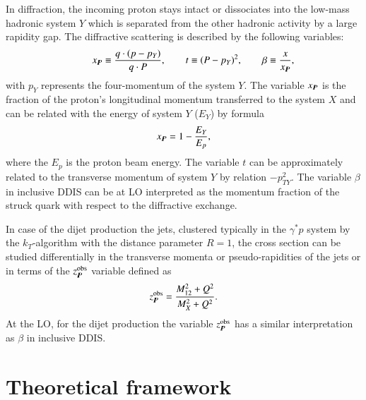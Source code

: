 \documentclass[12pt]{article}
\begin{document}
In diffraction, the incoming proton stays intact or dissociates into the low-mass hadronic system $Y$ which is separated from the other hadronic activity by a large rapidity gap.
The diffractive scattering is described by the following variables:
\begin{equation}
\qquad x_{I\!\!P} \equiv \frac{q \cdot (p - p_Y)}{q\cdot P},\qquad   t \equiv (P - p_Y)^2,       \qquad \beta \equiv \frac{x}{x_{I\!\!P}},
\end{equation}
with $p_Y$ represents the four-momentum of the system $Y$.
The variable $x_{I\!\!P}$ is the fraction of the proton's longitudinal momentum transferred to the system $X$ and can be related with the energy of system $Y$ ($E_Y$) by formula
\begin{equation}
x_{I\!\!P} = 1 - \frac{E_Y}{E_p},
\end{equation}
where the $E_p$ is the proton beam energy.
The variable $t$ can be approximately related to the transverse momentum of system $Y$ by relation $- p_{TY}^2$.
The variable $\beta$ in inclusive DDIS can be at LO interpreted as the  momentum fraction of the struck quark with respect to the diffractive exchange.

In case of the dijet production the jets, clustered typically in the $\gamma^{*}p$ system by the $k_T$-algorithm with the distance parameter $R = 1$, the cross section can be studied differentially in the transverse momenta or pseudo-rapidities of the jets or in terms of the $z_{I\!\!P}^\mathrm{obs}$ variable defined as
\begin{equation}
z_{I\!\!P}^\mathrm{obs} = \frac{M_{12}^2 + Q^2}{M_X^2 + Q^2}.
\end{equation}
At the LO, for the dijet production the variable $z_{I\!\!P}^\mathrm{obs}$ has a similar interpretation as $\beta$ in inclusive DDIS.


\section{Theoretical framework}
\end{document}
